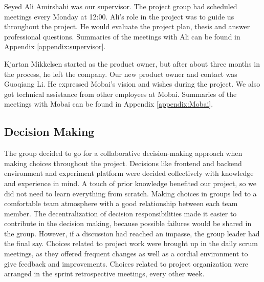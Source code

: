 Seyed Ali Amirshahi was our supervisor. The project group had scheduled meetings every Monday at 12:00. Ali's role in the project was to guide us throughout the project. He would evaluate the project plan, thesis and answer professional questions. Summaries of the meetings with Ali can be found in Appendix \ref{appendix:supervisor}.

Kjartan Mikkelsen started as the product owner, but after about three months in the process, he left the company. Our new product owner and contact was Guoqiang Li. He expressed Mobai's vision and wishes during the project. We also got technical assistance from other employees at Mobai. Summaries of the meetings with Mobai can be found in Appendix \ref{appendix:Mobai}.

\subsection{Decision Making}
The group decided to go for a collaborative decision-making \cite{GroupDecisionMaking} approach when making choices throughout the project. Decisions like frontend and backend environment and experiment platform were decided collectively with knowledge and experience in mind. A touch of prior knowledge benefited our project, so we did not need to learn everything from scratch. Making choices in groups led to a comfortable team atmosphere with a good relationship between each team member. The decentralization of decision responsibilities made it easier to contribute in the decision making, because possible failures would be shared in the group. However, if a discussion had reached an impasse, the group leader had the final say. Choices related to project work were brought up in the daily scrum meetings, as they offered frequent changes as well as a cordial environment to give feedback and improvements. Choices related to project organization were arranged in the sprint retrospective meetings, every other week. 

